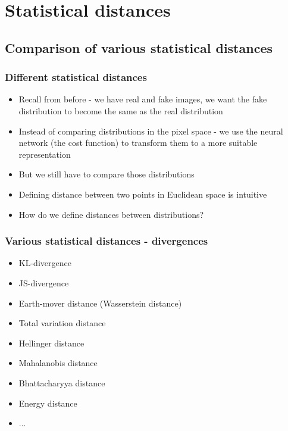 \documentclass{Bredelebeamer}
\begin{document}
\section{Statistical distances}
\subsection{Comparison of various statistical distances}
\begin{frame}
	\frametitle{Different statistical distances}
	\begin{itemize}[<+->]
		\item Recall from before - we have real and fake images, we want the fake distribution to become the same as the real distribution
		\item Instead of comparing distributions in the pixel space - we use the neural network (the cost function) to transform them to a more suitable representation
		\item But we still have to compare those distributions
		\item Defining distance between two points in Euclidean space is intuitive
		\item How do we define distances between distributions?
	\end{itemize}
\end{frame}
\begin{frame}
	\frametitle{Various statistical distances - divergences}
	\begin{itemize}
		\item KL-divergence
		\item JS-divergence
		\item Earth-mover distance (Wasserstein distance)
		\item Total variation distance
		\item Hellinger distance
		\item Mahalanobis distance
		\item Bhattacharyya distance
		\item Energy distance
		\item ...
	\end{itemize}
\end{frame}
\end{document}
